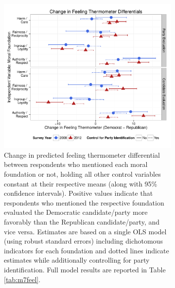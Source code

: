 \documentclass[12pt]{article}
\begin{document}
\begin{figure}[h]
  \centering
  \caption{Models predicting feeling thermometer differentials and vote choice based on moral reasoning including 2008 ANES data.}
  \begin{subfigure}[t]{0.49\textwidth}
    \includegraphics[scale=.4]{../calc/fig/appD11feel.pdf}
    \caption{Change in predicted feeling thermometer differential between respondents who mentioned each moral foundation or not, holding all other control variables constant at their respective means (along with 95\% confidence intervals). Positive values indicate that respondents who mentioned the respective foundation evaluated the Democratic candidate/party more favorably than the Republican candidate/party, and vice versa. Estimates are based on a single OLS model (using robust standard errors) including dichotomous indicators for each foundation and dotted lines indicate estimates while additionally controlling for party identification. Full model results are reported in Table \ref{tab:m7feel}.}\label{fig:appD11feel}
  \end{subfigure}
  \begin{subfigure}[t]{0.49\textwidth}

\end{subfigure}
\end{figure}
\end{document}
